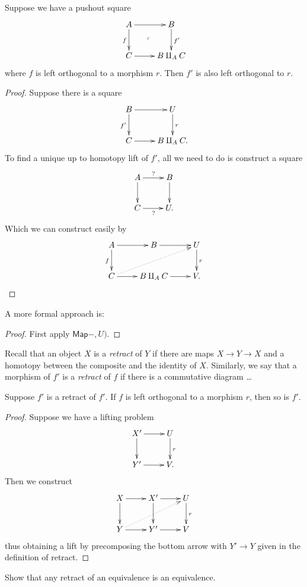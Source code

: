 \begin{lemma}
\label{lemma-orthogonal-lemma2}
Suppose we have a pushout square
$$
\xymatrix{
A\ar[r]\ar[d]_f\ar@{}[dr]|-{\ulcorner}&
B\ar[d]^{f'}\\
C\ar[r]&B \amalg_A C
}
$$
where $f$ is left orthogonal to a morphism
$r$.
Then $f'$ is also left orthogonal to $r$.
\end{lemma}

\begin{proof}
Suppose there is a square
$$
\xymatrix{
B\ar[r]\ar[d]_{f'}&U\ar[d]^{r}\\
C\ar[r]&B \amalg_A C.
}
$$
To find a unique up to homotopy lift of $f'$,
all we need to do is construct a square
$$
\xymatrix{
A\ar[r]^?\ar[d]&B\ar[d]\\
C\ar[r]_?&U.
}
$$
Which we can construct easily by
$$
\xymatrix{
A \ar[d]_f\ar[r]& B\ar[r]& U\ar[d]^r\\
C\ar@{.>}[urr]\ar[r]&  B \amalg_A C \ar[r]&V.
}
$$
\end{proof}

A more formal approach is:

\begin{proof}
First apply $\mathsf{Map}-,U)$.
\end{proof}

\begin{definition}
\label{definition-retract}
Recall that an object $X$ is a {\it retract}
of $Y$
if there are maps $X \to Y \to X$ and
a homotopy between the composite and the
identity of $X$.
Similarly,
we say that a morphism of $f'$ is
a {\it retract} of $f$ if there is a
commutative diagram
…
\end{definition}

\begin{lemma}
\label{lemma-retract-orthogonality}
Suppose $f'$ is a retract of $f'$.
If $f$ is left orthogonal to a morphism
$r$, then so is $f'$.
\end{lemma}

\begin{proof}
Suppose we have a lifting problem
$$
\xymatrix{
X'\ar[r]\ar[d]&U\ar[d]^r\\
Y'\ar[r]&V.
}
$$
Then we construct
$$
\xymatrix{
X\ar[r]\ar[d]&X'\ar[r]\ar[d]&U\ar[d]^{r}\\
Y\ar[r]\ar@{.>}[urr]&Y'\ar[r]&V
}
$$
thus obtaining a lift by precomposing the
bottom arrow with $Y' \to Y$
given in the definition of retract.
\end{proof}

\begin{exercise}
\label{exercise-retra-equiv-equiv}
Show that any retract of an equivalence is an
equivalence.
\end{exercise}

